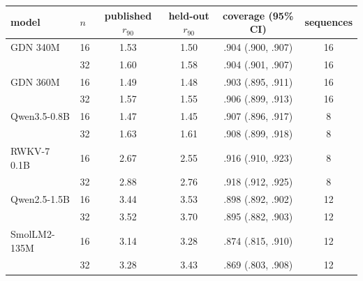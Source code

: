 \begin{tabular}{llcccc}
\toprule
model & $n$ & published $r_{90}$ & held-out $r_{90}$ & coverage (95\% CI) & sequences \\
\midrule
GDN 340M & 16 & 1.53 & 1.50 & .904 (.900, .907) & 16 \\
 & 32 & 1.60 & 1.58 & .904 (.901, .907) & 16 \\
\midrule
GDN 360M & 16 & 1.49 & 1.48 & .903 (.895, .911) & 16 \\
 & 32 & 1.57 & 1.55 & .906 (.899, .913) & 16 \\
\midrule
Qwen3.5-0.8B & 16 & 1.47 & 1.45 & .907 (.896, .917) & 8 \\
 & 32 & 1.63 & 1.61 & .908 (.899, .918) & 8 \\
\midrule
RWKV-7 0.1B & 16 & 2.67 & 2.55 & .916 (.910, .923) & 8 \\
 & 32 & 2.88 & 2.76 & .918 (.912, .925) & 8 \\
\midrule
Qwen2.5-1.5B & 16 & 3.44 & 3.53 & .898 (.892, .902) & 12 \\
 & 32 & 3.52 & 3.70 & .895 (.882, .903) & 12 \\
\midrule
SmolLM2-135M & 16 & 3.14 & 3.28 & .874 (.815, .910) & 12 \\
 & 32 & 3.28 & 3.43 & .869 (.803, .908) & 12 \\
\bottomrule
\end{tabular}
